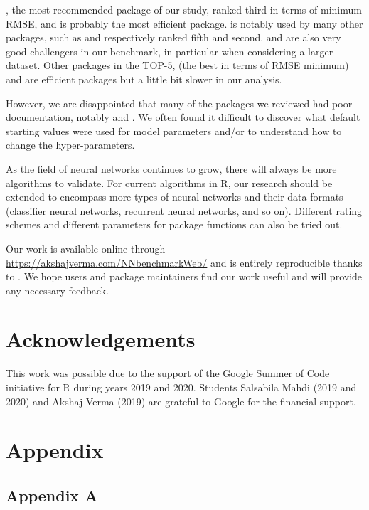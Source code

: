 , the most recommended package of our study, ranked third in
terms of minimum RMSE, and is probably the most efficient package.
 is notably used by many other packages, such as
 and  respectively ranked fifth and second.
 and  are also very good challengers in our
benchmark, in particular when considering a larger dataset. Other
packages in the TOP-5,  (the best in terms of RMSE minimum)
and  are efficient packages but a little bit slower in our
analysis.

However, we are disappointed that many of the packages we reviewed had
poor documentation, notably  and . We often
found it difficult to discover what default starting values were used
for model parameters and/or to understand how to change the
hyper-parameters.

As the field of neural networks continues to grow, there will always be
more algorithms to validate. For current algorithms in R, our research
should be extended to encompass more types of neural networks and their
data formats (classifier neural networks, recurrent neural networks, and
so on). Different rating schemes and different parameters for package
functions can also be tried out.

Our work is available online through
\url{https://akshajverma.com/NNbenchmarkWeb/} and is entirely
reproducible thanks to . We hope users and package
maintainers find our work useful and will provide any necessary
feedback.

\hypertarget{acknowledgements}{%
\section{Acknowledgements}\label{acknowledgements}}

This work was possible due to the support of the Google Summer of Code
initiative for R during years 2019 and 2020. Students Salsabila Mahdi
(2019 and 2020) and Akshaj Verma (2019) are grateful to Google for the
financial support.



\hypertarget{appendix}{%
\section{Appendix}\label{appendix}}

\hypertarget{appendix-a}{%
\subsection{Appendix A}\label{appendix-a}}

